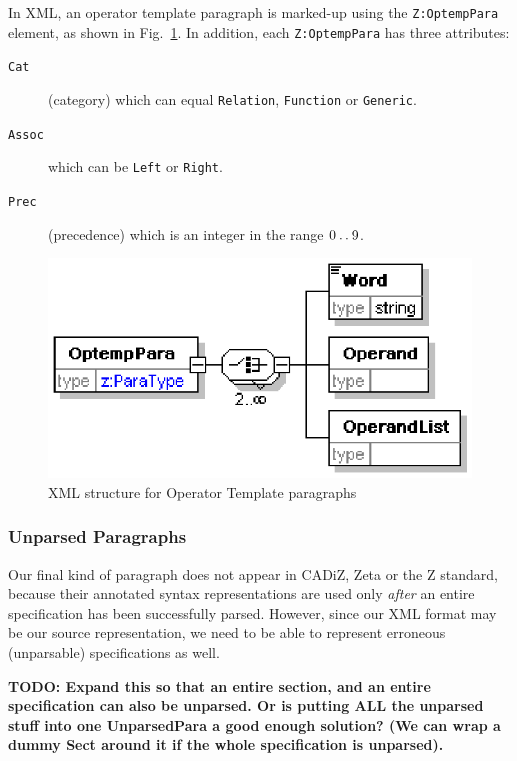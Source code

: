 \documentclass{llncs}  %
\newcommand{\AFont}[1]{\texttt{#1}}
\newcommand{\CADiZ}{CADiZ}
\newcommand{\Zeta}{Zeta}
\newcommand{\TODO}[1]{\textbf{TODO: #1}}   %
\begin{document}
In XML, an operator template paragraph is marked-up using
the \AFont{Z:OptempPara} element, as shown in Fig.~\ref{fig:optemppara}.
In addition, each \AFont{Z:OptempPara} has three attributes:
\begin{description}
\item[\AFont{Cat}] (category) which can equal \AFont{Relation},
  \AFont{Function} or \AFont{Generic}.  
\item[\AFont{Assoc}] which can be \AFont{Left} or \AFont{Right}. 
\item[\AFont{Prec}] (precedence) which is an integer in the range $0 \mathbin{\mathstrut{\ldotp\ldotp}}
  9$.
\end{description}

\begin{figure}[htbp]
  \centering
  \includegraphics{optemppara.eps}
  \caption{XML structure for Operator Template paragraphs}
  \label{fig:optemppara}
\end{figure}


\subsubsection{Unparsed Paragraphs}

Our final kind of paragraph does not appear in \CADiZ, {\Zeta}
or the Z standard, because their annotated syntax representations
are used only \emph{after} an entire specification has been successfully
parsed.  However, since our XML format may be our source representation,
we need to be able to represent erroneous (unparsable) specifications as
well. 

\TODO{Expand this so that an entire section, and an entire specification
  can also be unparsed.  Or is putting ALL the unparsed stuff into one
  UnparsedPara a good enough solution?  (We can wrap a dummy Sect around it
  if the whole specification is unparsed).}
\end{document}
